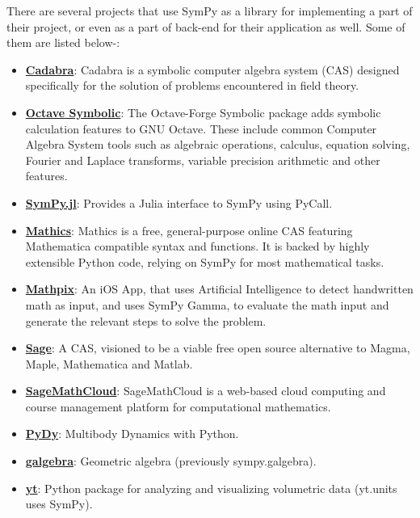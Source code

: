 There are several projects that use SymPy as a library for implementing
a part of their project, or even as a part of back-end for their 
application as well.
\newline
Some of them are listed below-:

\begin{itemize}
\item
  \href{http://cadabra.science/index.html}{\textbf{Cadabra}}: Cadabra is
  a symbolic computer algebra system (CAS) designed specifically for the
  solution of problems encountered in field theory.
\item
  \href{http://octave.sourceforge.net/symbolic/}{\textbf{Octave Symbolic}}:
  The Octave-Forge Symbolic package adds symbolic calculation features
  to GNU Octave. These include common Computer Algebra System tools such
  as algebraic operations, calculus, equation solving, Fourier and
  Laplace transforms, variable precision arithmetic and other features.
\item
  \href{https://github.com/jverzani/SymPy.jl}{\textbf{SymPy.jl}}:
  Provides a Julia interface to SymPy using PyCall.
\item
  \href{https://mathics.github.io/}{\textbf{Mathics}}: Mathics is a
  free, general-purpose online CAS featuring Mathematica compatible
  syntax and functions. It is backed by highly extensible Python code,
  relying on SymPy for most mathematical tasks.
\item
  \href{http://mathpix.com/}{\textbf{Mathpix}}: An iOS App, that uses
  Artificial Intelligence to detect handwritten math as input, and uses
  SymPy Gamma, to evaluate the math input and generate the relevant
  steps to solve the problem.
\item
  \href{http://www.sagemath.org/}{\textbf{Sage}}: A CAS, visioned to be
  a viable free open source alternative to Magma, Maple, Mathematica and
  Matlab.
\item
  \href{https://cloud.sagemath.com}{\textbf{SageMathCloud}}:
  SageMathCloud is a web-based cloud computing and course management
  platform for computational mathematics.
\item
  \href{http://www.pydy.org/}{\textbf{PyDy}}: Multibody Dynamics with
  Python.
\item
  \href{https://github.com/brombo/galgebra}{\textbf{galgebra}}:
  Geometric algebra (previously sympy.galgebra).
\item
  \href{http://yt-project.org/}{\textbf{yt}}: Python package for
  analyzing and visualizing volumetric data (yt.units uses SymPy).

\end{itemize}
